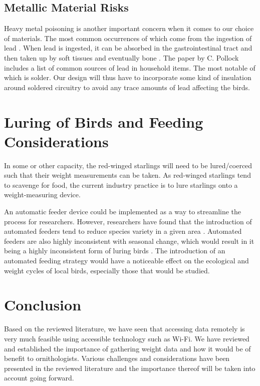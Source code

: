 \documentclass[class=report,11pt,crop=false]{standalone}
\begin{document}
\subsection{Metallic Material Risks}
Heavy metal poisoning is another important concern when it comes to our choice of materials. The most common occurrences of which come from the ingestion of lead \cite{PollockHeavyMetal}. When lead is ingested, it can be absorbed in the gastrointestinal tract and then taken up by soft tissues and eventually bone \cite{PollockHeavyMetal}. The paper by C. Pollock includes a list of common sources of lead in household items. The most notable of which is solder. Our design will thus have to incorporate some kind of insulation around soldered circuitry to avoid any trace amounts of lead affecting the birds.

\pagebreak
\section{Luring of Birds and Feeding Considerations}

In some or other capacity, the red-winged starlings will need to be lured/coerced such that their weight measurements can be taken. As red-winged starlings tend to scavenge for food, the current industry practice is to lure starlings onto a weight-measuring device. 

An automatic feeder device could be implemented as a way to streamline the process for researchers. However, researchers have found that the introduction of automated feeders tend to reduce species variety in a given area \cite{GalbraithFeeders}. Automated feeders are also highly inconsistent with seasonal change, which would result in it being a highly inconsistent form of luring birds \cite{GalbraithFeeders}. The introduction of an automated feeding strategy would have a noticeable effect on the ecological and weight cycles of local birds, especially those that would be studied.

\section{Conclusion}

Based on the reviewed literature, we have seen that accessing data remotely is very much feasible using accessible technology such as Wi-Fi. We have reviewed and established the importance of gathering weight data and how it would be of benefit to ornithologists. Various challenges and considerations have been presented in the reviewed literature and the importance thereof will be taken into account going forward. 


\ifstandalone

\printnoidxglossary[type=\acronymtype,nonumberlist]
\fi
\end{document}
